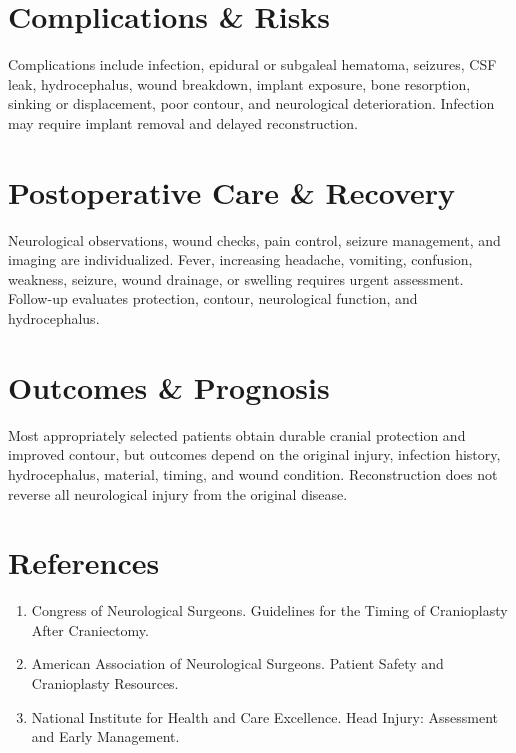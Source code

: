 \section*{Complications \& Risks}
Complications include infection, epidural or subgaleal hematoma, seizures, CSF leak, hydrocephalus, wound breakdown, implant exposure, bone resorption, sinking or displacement, poor contour, and neurological deterioration. Infection may require implant removal and delayed reconstruction.

\section*{Postoperative Care \& Recovery}
Neurological observations, wound checks, pain control, seizure management, and imaging are individualized. Fever, increasing headache, vomiting, confusion, weakness, seizure, wound drainage, or swelling requires urgent assessment. Follow-up evaluates protection, contour, neurological function, and hydrocephalus.

\section*{Outcomes \& Prognosis}
Most appropriately selected patients obtain durable cranial protection and improved contour, but outcomes depend on the original injury, infection history, hydrocephalus, material, timing, and wound condition. Reconstruction does not reverse all neurological injury from the original disease.

\section*{References}
\begin{enumerate}
  \item Congress of Neurological Surgeons. Guidelines for the Timing of Cranioplasty After Craniectomy.
  \item American Association of Neurological Surgeons. Patient Safety and Cranioplasty Resources.
  \item National Institute for Health and Care Excellence. Head Injury: Assessment and Early Management.
\end{enumerate}

\clearpage

